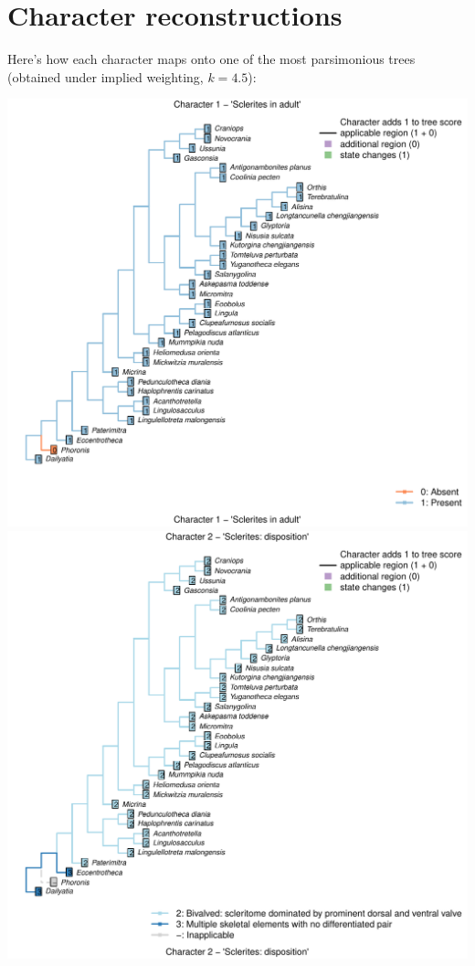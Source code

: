 \documentclass[]{book}
\theoremstyle{definition}
\theoremstyle{definition}
\theoremstyle{definition}
\theoremstyle{remark}
\begin{document}
\hypertarget{reconstructions}{%
\chapter{Character reconstructions}\label{reconstructions}}

Here's how each character maps onto one of the most parsimonious trees
(obtained under implied weighting, \(k = 4.5\)):

\includegraphics{Brachiopod_phylogeny_files/figure-latex/unnamed-chunk-4-1.pdf}
\includegraphics{Brachiopod_phylogeny_files/figure-latex/unnamed-chunk-4-2.pdf}
\end{document}
